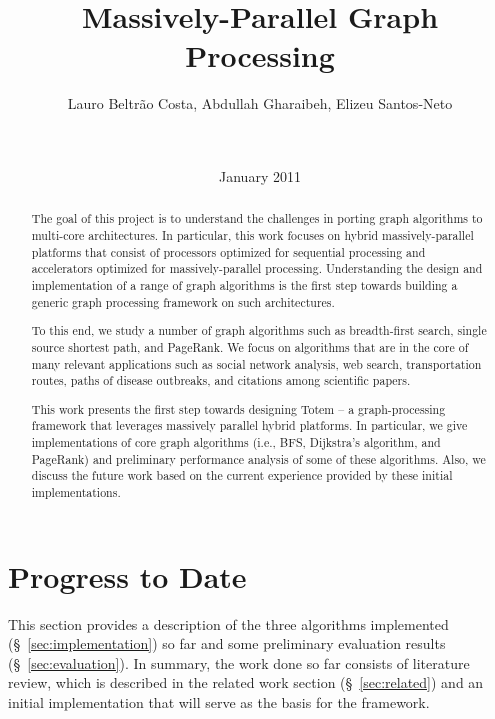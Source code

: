 \documentclass{acm_proc_article-sp}[12pt]
\title{Massively-Parallel Graph Processing}
\author{
\alignauthor 
Lauro Beltr\~ao Costa, Abdullah Gharaibeh, Elizeu
Santos-Neto\vspace{3mm}\\
       \affaddr{\small{University of British Columbia}}\\
       \affaddr{\small{2332 Main Mall, Vancouver, BC, CANADA}}\\
       \email{\small{\{lauroc,abdullah,elizeus\}@ece.ubc.ca}}
}
\date{ January 2011}
\newcommand{\comment}[2]{\begin{center}\colorbox{#1}{\parbox{0.85\linewidth}{\textit{{#2}}}}\end{center}}
\newcommand{\abdullah}[1]{\comment{midblue}{{Abdullah: #1}}}
\newcommand{\lauro}[1]{\comment{orange}{{Lauro: #1}}}
\newcommand{\elizeu}[1]{\comment{lightgreen}{{Elizeu: #1}}}
\begin{document}
\maketitle


\begin{abstract}
The goal of this project is to understand the challenges in porting graph algorithms to multi-core architectures. In particular, this work focuses on hybrid massively-parallel platforms that consist of processors optimized for sequential processing and accelerators optimized for massively-parallel processing. Understanding the design and implementation of a range of graph algorithms is the first step towards building a generic graph processing framework on such architectures.

To this end, we study a number of graph algorithms such as breadth-first search, single source shortest path, and PageRank. We focus on algorithms that are in the core of many relevant applications such as social network analysis, web search, transportation routes, paths of disease outbreaks, and citations among scientific papers.

This work presents the first step towards designing {\sc Totem} -- a graph-processing framework that leverages massively parallel hybrid platforms. In particular, we give implementations of core graph algorithms (i.e., BFS, Dijkstra's algorithm, and PageRank) and preliminary performance analysis of some of these algorithms. Also, we discuss the future work based on the current experience provided by these initial implementations.


\end{abstract}






\section{Progress to Date}
\label{sec:progress}

This section provides a description of the three algorithms implemented (\S~\ref{sec:implementation}) so far and some preliminary evaluation results (\S~\ref{sec:evaluation}). In summary, the work done so far consists of literature review, which is described in the related work section (\S~\ref{sec:related}) and an initial implementation that will serve as the basis for the framework.


%






\end{document}
